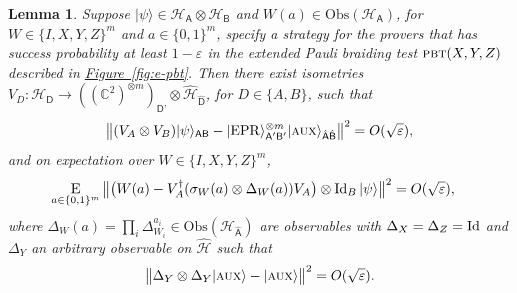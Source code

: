 \documentclass[11pt]{article}
\numberwithin{equation}{section}
\newtheorem{lemma}[theorem]{Lemma}
\theoremstyle{definition}
\theoremstyle{plain}
\newcommand{\C}{\mathbb C}
\newcommand{\expref}[2]{\hyperref[#2]{#1~\ref{#2}}}
\newcommand{\ket}[1]{|#1\rangle}
\newcommand{\Id}{\ensuremath{\mathop{\rm Id}\nolimits}}
\newcommand{\Es}[1]{\ensuremath{\mathop{\textsc{E}}}_{#1}} %
\newcommand{\setft}[1]{\mathrm{#1}}
\newcommand{\Obs}{\setft{Obs}}
\newcommand{\reg}[1]{{\textsf{#1}}}
\newcommand{\mH}{\mathcal{H}}
\newcommand{\eps}{\varepsilon}
\newcommand{\EPR}{{\rm EPR}}
\newcommand{\pbt}{\textsc{pbt}}
\newcommand{\aux}{\textsc {aux}}
\begin{document}
\begin{lemma}
Suppose $\ket{\psi}\in\mH_\reg{A}\otimes \mH_\reg{B}$ and $W(a) \in \Obs(\mH_\reg{A})$, for $W\in \{I,X,Y,Z\}^m$ and $a\in\{0,1\}^m$, specify a strategy for the provers that has success probability at least $1-\eps$ in the extended Pauli braiding test $\pbt(X,Y,Z)$ described in \expref{Figure}{fig:e-pbt}. 
Then there exist isometries $V_D:\mH_\reg{D} \to ((\C^2)^{\otimes m})_{\reg{D'}}  \otimes \hat{\mH}_{\hat{\reg{D}}}$, for $D\in\{A,B\}$, such that
$$\big\| (V_A \otimes V_B) \ket{\psi}_{\reg{AB}} - \ket{\EPR}_{\reg{A}'\reg{B}'}^{\otimes m} \ket{\aux}_{\hat{\reg{A}}\hat{\reg{B}}} \big\|^2 = O(\sqrt{\eps}),$$
and on expectation over  $W\in \{I,X,Y,Z\}^m$,
\begin{align}\label{eq:test-sigmay-2}
 \Es{a\in\{0,1\}^m} \big\| \big(W(a) -V_A^\dagger (\sigma_W(a) \otimes \Delta_W(a)) V_A\big) \otimes \Id_B \ket{\psi} \big\|^2 &= O(\sqrt{\eps}),
\end{align}
where $\Delta_W(a) = \prod_i \Delta_{W_i}^{a_i} \in \Obs({\mH}_{\hat{\reg{A}}})$ are observables with $\Delta_{X}=\Delta_{Z}=\Id$ and $\Delta_{Y}$ an arbitrary observable on $\hat{\mH}$ such that
	$$ \big\|\Delta_Y \otimes \Delta_Y \ket{\aux} - \ket{\aux} \big\|^2 = O(\sqrt{\eps}).$$
\end{lemma}
\end{document}
